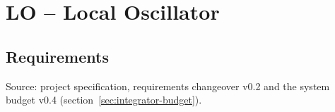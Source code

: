 
\chapter{LO -- Local Oscillator}
\label{ch:lo}

\section{Requirements}
Source: project specification, requirements changeover v0.2 and the system budget v0.4
(section~\ref{sec:integrator-budget}).


